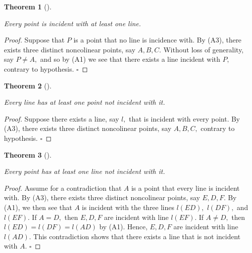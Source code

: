 \documentclass[
  twoside,
  12pt,
  letterpaper,
  fleqn]{article}
\theoremstyle{definition}
\theoremstyle{definition}
\theoremstyle{plain}
\theoremstyle{plain}
\newtheorem{theorem}{Theorem}[section]
\theoremstyle{remark}
\begin{document}
\begin{theorem}[]\protect\hypertarget{thm-three}{}\label{thm-three}

Every point is incident with at least one line.

\end{theorem}

\begin{proof}

Suppose that \(P\) is a point that no line is incidence with. By (A3),
there exists three distinct noncolinear points, say \(A, B, C.\) Without
loss of generality, say \(P\neq A,\) and so by (A1) we see that there
exists a line incident with \(P,\) contrary to hypothesis. \(\square\)

\end{proof}

\begin{theorem}[]\protect\hypertarget{thm-four}{}\label{thm-four}

Every line has at least one point not incident with it.

\end{theorem}

\begin{proof}

Suppose there exists a line, say \(l,\) that is incident with every
point. By (A3), there exists three distinct noncolinear points, say
\(A, B, C,\) contrary to hypothesis. \(\square\)

\end{proof}

\begin{theorem}[]\protect\hypertarget{thm-five}{}\label{thm-five}

Every point has at least one line not incident with it.

\end{theorem}

\begin{proof}

Assume for a contradiction that \(A\) is a point that every line is
incident with. By (A3), there exists three distinct noncolinear points,
say \(E, D, F.\) By (A1), we then see that \(A\) is incident with the
three lines \(l(ED),\) \(l(DF),\) and \(l(EF).\) If \(A=D,\) then
\(E, D, F\) are incident with line \(l(EF).\) If \(A\neq D,\) then
\(l(ED)=l(DF)=l(AD)\) by (A1). Hence, \(E, D, F\) are incident with line
\(l(AD).\) This contradiction shows that there exists a line that is not
incident with \(A.\) \(\square\)

\end{proof}
\end{document}

